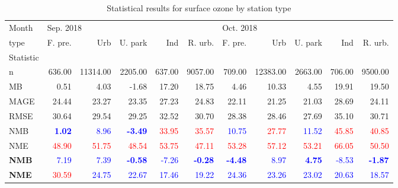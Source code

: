 \begin{table}
\begin{threeparttable}[b]
\centering
\caption{Statistical results for surface ozone by station type}
\label{tab: o3_sta}
\begin{tabular}{lrrrrrrrrrr}
\toprule
Month & \multicolumn{5}{l}{Sep. 2018} & \multicolumn{5}{l}{Oct. 2018} \\
type &   F. pre. &       Urb &  U. park &     Ind &  R. urb. &   F. pre. &       Urb &  U. park &     Ind &  R. urb. \\
Statistic\tnote{(a)} \\
\midrule
n    &    636.00 &  11314.00 &  2205.00 &  637.00 &  9057.00 &    709.00 &  12383.00 &  2663.00 &  706.00 &  9500.00 \\
MB   &      0.51 &      4.03 &    -1.68 &   17.20 &    18.75 &      4.46 &     10.33 &     4.55 &   19.91 &    19.50 \\
MAGE &     24.44 &     23.27 &    23.35 &   27.23 &    24.83 &     22.11 &     21.25 &    21.03 &   28.69 &    24.11 \\
RMSE &     30.64 &     29.54 &    29.25 &   32.52 &    30.70 &     28.38 &     28.46 &    27.69 &   35.10 &    30.71 \\
NMB\tnote{(b)}  &      \textcolor{blue}{\bf 1.02} &      \textcolor{blue}{8.96} &    \textcolor{blue}{\bf -3.49} &   \textcolor{red}{33.95} &    \textcolor{red}{35.57} &     \textcolor{blue}{10.75} &     \textcolor{red}{27.77} &    \textcolor{blue}{11.52} &   \textcolor{red}{45.85} &    \textcolor{red}{40.85} \\
NME\tnote{(b)}  &     \textcolor{red}{48.90} &     \textcolor{red}{51.75} &    \textcolor{red}{48.54} &   \textcolor{red}{53.75} &    \textcolor{red}{47.11} &     \textcolor{red}{53.28} &     \textcolor{red}{57.12} &    \textcolor{red}{53.21} &   \textcolor{red}{66.05} &    \textcolor{red}{50.50} \\
\bf NMB\tnote{(c)} & \textcolor{blue}{7.19} & \textcolor{blue}{7.39} & \textcolor{blue}{\bf -0.58} & \textcolor{blue}{-7.26} &    \textcolor{blue}{\bf -0.28} &     \textcolor{blue}{\bf -4.48} &  \textcolor{blue}{8.97} &     \textcolor{blue}{\bf 4.75} &   \textcolor{blue}{-8.53} &    \textcolor{blue}{\bf -1.87} \\
\bf NME\tnote{(c)} & \textcolor{red}{30.59} &     \textcolor{blue}{24.75} &    \textcolor{blue}{22.67} &   \textcolor{blue}{17.46} &    \textcolor{blue}{19.22} &     \textcolor{blue}{24.36} &     \textcolor{blue}{23.26} &    \textcolor{blue}{23.02} &   \textcolor{blue}{20.63} &    \textcolor{blue}{18.57} \\

\end{tabular}
\end{threeparttable}
\end{table}
